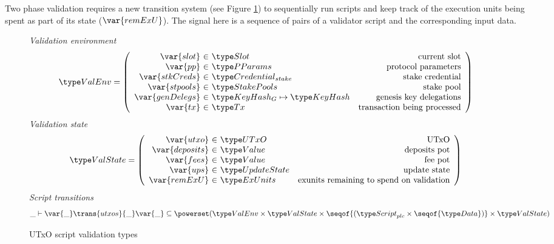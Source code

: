 Two phase validation requires a new transition system
(see Figure \ref{fig:ts-types:utxo-scripts}) to sequentially run
scripts and keep track of the execution units being spent as part of its state
($\var{remExU}$). The signal here is a sequence of pairs of a validator
script and the corresponding input data.

\begin{figure}[htb]
  \emph{Validation environment}
  \begin{equation*}
    \ValEnv =
    \left(
      \begin{array}{r@{~\in~}lr}
        \var{slot} & \Slot & \text{current slot}\\
        \var{pp} & \PParams & \text{protocol parameters}\\
        \var{stkCreds} & \StakeCredential & \text{stake credential}\\
        \var{stpools} & \StakePools & \text{stake pool}\\
        \var{genDelegs} & \KeyHashGen\mapsto\KeyHash & \text{genesis key delegations} \\
        \var{tx} & \Tx & \text{transaction being processed} \\
      \end{array}
    \right)
  \end{equation*}
  \emph{Validation state}
  \begin{equation*}
    \ValState =
    \left(
      \begin{array}{r@{~\in~}lr}
        \var{utxo} & \UTxO & \text{UTxO}\\
        \var{deposits} & \Value & \text{deposits pot}\\
        \var{fees} & \Value & \text{fee pot}\\
        \var{ups} & \UpdateState & \text{update state}\\
        \var{remExU} & \ExUnits & \text{exunits remaining to spend on validation} \\
      \end{array}
    \right)
  \end{equation*}
  \emph{Script transitions}
  \begin{equation*}
    \_ \vdash
    \var{\_} \trans{utxos}{\_} \var{\_}
    \subseteq \powerset (\ValEnv \times \ValState \times \seqof{(\ScriptPlutus\times\seqof{\Data})} \times \ValState)
  \end{equation*}
  \caption{UTxO script validation types}
  \label{fig:ts-types:utxo-scripts}
\end{figure}

